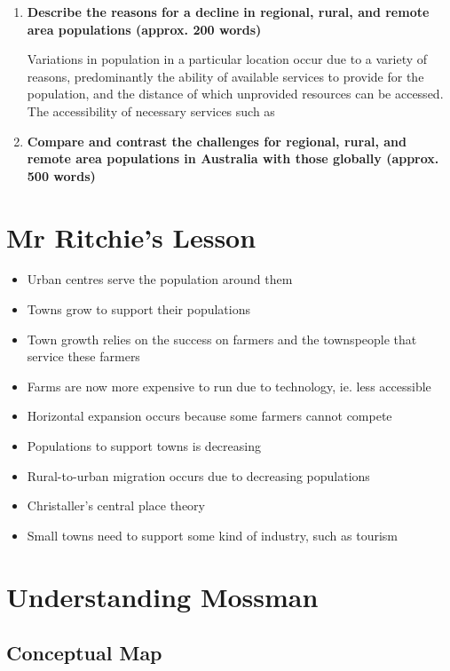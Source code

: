 		\begin{enumerate}
			\item \textbf{Describe the reasons for a decline in regional, rural, and remote area populations (approx. 200 words)}

				Variations in population in a particular location occur due to a variety of reasons, predominantly the ability of available services to provide for the population, and the distance of which unprovided resources can be accessed. The accessibility of necessary services such as 


			\item \textbf{Compare and contrast the challenges for regional, rural, and remote area populations in Australia with those globally (approx. 500 words)}
		\end{enumerate}

\section{Mr Ritchie's Lesson} \label{05/03/2025}

	\begin{itemize}
		\item Urban centres serve the population around them
		\item Towns grow to support their populations
		\item Town growth relies on the success on farmers and the townspeople that service these farmers
		\item Farms are now more expensive to run due to technology, ie. less accessible
		\item Horizontal expansion occurs because some farmers cannot compete
		\item Populations to support towns is decreasing
		\item Rural-to-urban migration occurs due to decreasing populations
		\item Christaller's central place theory
		\item Small towns need to support some kind of industry, such as tourism
	\end{itemize}

\section{Understanding Mossman}

	\subsection{Conceptual Map}
	

